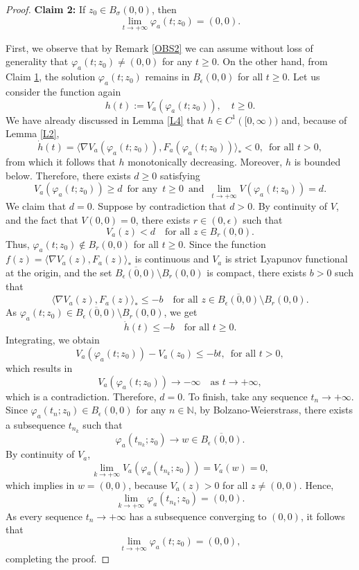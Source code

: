 \documentclass[10pt,a4paper]{amsart}
\begin{document}
\begin{proof}
\noindent\textbf{\hypertarget{C2}{Claim 2:}} If $z_0 \in B_ \sigma(0,0)$, then
$$
\lim_{t \to +\infty} \varphi_a(t;z_0) = (0,0).
$$
	
First, we observe that by Remark \ref{OBS2} we can assume without loss of generality that $\varphi_a(t;z_0) \neq (0,0)$ for any $t\ge 0$. On the other hand, from Claim \hyperlink{C1}{1}, the solution $\varphi_a(t;z_0)$ remains in $B_\epsilon(0,0)$ for all $t \geq 0$. Let us consider the function again
$$
h(t) := V_a(\varphi_a(t;z_0)), \quad t \geq 0.
$$
We have already discussed in Lemma \ref{L4} that $h \in C^1([0, \infty))$ and, because of Lemma \ref{L2}, 
$$
\dot{h}(t) = \langle \nabla V_a(\varphi_a(t;z_0)), F_a(\varphi_a(t;z_0)) \rangle_* < 0, \, \text{ for all }t > 0,
$$
from which it follows that $h$ monotonically decreasing. Moreover, $h$ is bounded below. Therefore, there exists $d \geq 0$ satisfying
$$
V_a(\varphi_a(t;z_0))\ge d \, \text{ for any }\, t\ge 0\, \text{ and }\, \lim_{t \to +\infty} V(\varphi_a(t;z_0)) = d.
$$
We claim that $d = 0$. Suppose by contradiction that $d > 0$. By continuity of $V$, and the fact that $V(0,0) = 0$, there exists $r \in (0, \epsilon)$ such that
$$
V_a(z) < d \quad \text{for all } z \in B_r(0,0).
$$
Thus, $\varphi_a(t;z_0) \notin B_r(0,0)$ for all $t \geq 0$. Since the function $f(z) = \langle \nabla V_a(z), F_a(z) \rangle_*$ is continuous and $V_a$ is strict Lyapunov functional at the origin, and the set $\overline{B_\epsilon(0,0)} \setminus B_r(0,0)$ is compact, there exists $b > 0$ such that
$$
\langle \nabla V_a(z), F_a(z) \rangle_* \leq -b \quad \text{for all } z \in \overline{B_\epsilon(0,0)} \setminus B_r(0,0).
$$
As $\varphi_a(t;z_0) \in \overline{B_\epsilon(0,0)} \setminus B_r(0,0)$, we get
$$
\dot{h}(t) \leq -b \quad \text{for all } t \geq 0.
$$
Integrating, we obtain
$$
V_a(\varphi_a(t;z_0)) - V_a(z_0) \leq -bt,\, \text{ for all }t>0,
$$
which results in
$$
V_a(\varphi_a(t;z_0)) \to -\infty \quad \text{as } t \to +\infty,
$$
which is a contradiction. Therefore, $d = 0$. To finish, take any sequence $t_n \to +\infty$. Since $\varphi_a(t_n;z_0) \in B_\epsilon(0,0)$ for any $n\in\mathbb{N}$, by Bolzano-Weierstrass, there exists a subsequence $t_{n_k}$ such that
$$
\varphi_a(t_{n_k};z_0) \to w \in \overline{B_\epsilon(0,0)}.
$$
By continuity of $V_a$,
$$
\lim_{k \to +\infty} V_a(\varphi_a(t_{n_k};z_0)) = V_a(w) = 0,
$$
which implies in $w = (0,0)$, because $V_a(z) > 0$ for all $z \neq (0,0)$. Hence,
$$
\lim_{k \to+ \infty} \varphi_a(t_{n_k};z_0) = (0,0).
$$
As every sequence $t_n \to +\infty$ has a subsequence converging to $(0,0)$, it follows that
$$
\lim_{t \to +\infty} \varphi_a(t;z_0) = (0,0),
$$
completing the proof.
\end{proof}
\end{document}
